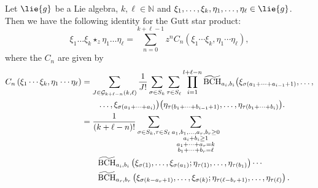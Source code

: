 \begin{proposition}
	\label{Formulas:Prop:2MonomialsFormula2}
	Let $\lie{g}$ be a Lie algebra, $k, \ell \in \mathbb{N}$ and $\xi_1, 
	\ldots, \xi_k, \eta_1, \ldots, \eta_{\ell} \in \lie{g}$. Then we 
	have the following identity for the Gutt star product:
	\begin{equation*}
    		\xi_1 \ldots \xi_k \star_z \eta_1 \ldots \eta_{\ell}
    		=
		\sum\limits_{n=0}^{k + \ell -1}
    		z^n C_n
    		\left( 
    			\xi_1 \cdots \xi_k, \eta_1 \cdots \eta_{\ell}
    		\right),
	\end{equation*}
	where the $C_n$ are given by
	\begin{align}
		\nonumber
        C_n
        \left( 
    			\xi_1 \cdots \xi_k, \eta_1 \cdots \eta_{\ell}
    		\right)
        & =
        \sum\limits_{J \in \mathcal{G}_{k + \ell - n}(k, \ell)}
        \frac{1}{J!}
        \sum\limits_{\sigma \in S_k}
        \sum\limits_{\tau \in S_{\ell}}
        \prod_{i=1}^{l + \ell - n}
        \widetilde{\mathrm{BCH}}_{a_i, b_i}
        \big( \xi_{\sigma(a_1 + \cdots + a_{i - 1} + 1)}, 
            \ldots, 
        \\
        \label{Formulas:2MonomialsFormula2}
        & \qquad            
            \ldots, \xi_{\sigma(a_1 + \cdots + a_i)} \big)
        \big( \eta_{\tau(b_1 + \cdots + b_{i - 1} + 1)}, 
            \ldots, \eta_{\tau(b_1 + \cdots + b_i)} \big).
        \\
        \nonumber
        & =
        \frac{1}{(k + \ell - n)!}
        \sum\limits_{\sigma \in S_k, \tau \in S_{\ell}}
        \sum\limits_{\substack{a_1, b_1, \ldots, a_r, b_r \geq 0 \\
            a_i + b_i \geq 1 \\
            a_1 + \cdots + a_r = k \\
            b_1 + \cdots + b_r = \ell
          }
        }
        \\
        \nonumber
        & \qquad
        \widetilde{\mathrm{BCH}}_{a_i, b_i}\left(\xi_{\sigma(1)}, \ldots, \xi_{\sigma(a_1)}; \eta_{\tau(1)}, \ldots, \eta_{\tau(b_1)}\right)
        \cdots
        \\
        \label{Formulas:2MonomialsFormula22}
        & \qquad
        \widetilde{\mathrm{BCH}}_{a_r, b_r}\left(\xi_{\sigma(k - a_r + 1)}, \ldots, \xi_{\sigma(k)}; \eta_{\tau(\ell - b_r + 1)}, \ldots, \eta_{\tau(\ell)}\right).
	\end{align}
\end{proposition}
